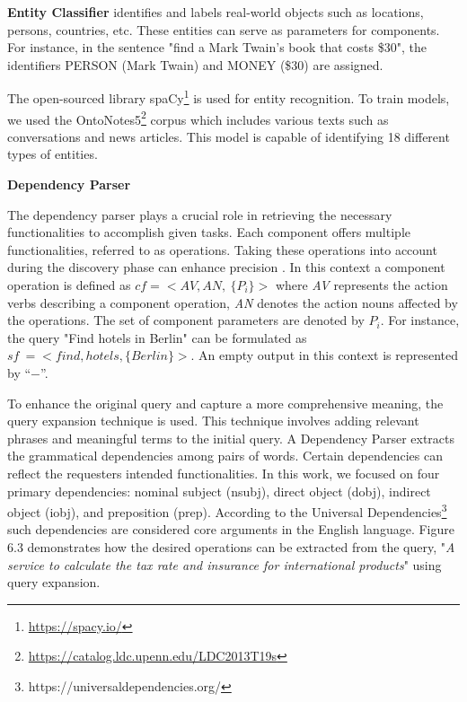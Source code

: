 \textbf{Entity Classifier} identifies and labels real-world objects such
as locations, persons, countries, etc. These entities can serve as
parameters for components. For instance, in the sentence "find a Mark
Twain's book that costs \$30", the identifiers PERSON (Mark Twain) and
MONEY (\$30) are assigned.

The open-sourced library spaCy\footnote{\url{https://spacy.io/}} is used
for entity recognition. To train models, we used the
OntoNotes5\footnote{\url{https://catalog.ldc.upenn.edu/LDC2013T19s}}
corpus which includes various texts such as conversations and news
articles. This model is capable of identifying 18 different types of
entities.


\textbf{Dependency Parser}

The dependency parser plays a crucial role in retrieving the necessary
functionalities to accomplish given tasks. Each component offers
multiple functionalities, referred to as operations. Taking these
operations into account during the discovery phase can enhance precision
\autocite{Zarei2021}. In this context a component operation is
defined as \(cf = < AV,AN,\ \{ P_{i}\} >\) where \emph{AV} represents
the action verbs describing a component operation, \emph{AN} denotes the
action nouns affected by the operations. The set of component parameters
are denoted by \(P_{i}\). For instance, the query "Find hotels in
Berlin" can be formulated as \(sf\  = < find,hotels,\{ Berlin\} >\). An
empty output in this context is represented by ``\(-\)''.

To enhance the original query and capture a more comprehensive meaning,
the query expansion technique is used. This technique involves adding
relevant phrases and meaningful terms to the initial query. A Dependency
Parser extracts the grammatical dependencies among pairs of words.
Certain dependencies can reflect the requester\textquotesingle s
intended functionalities. In this work, we focused on four primary
dependencies: nominal subject (nsubj), direct object (dobj), indirect
object (iobj), and preposition (prep). According to the Universal
Dependencies\footnote{https://universaldependencies.org/} such
dependencies are considered core arguments in the English language.
Figure 6.3 demonstrates how the desired operations can be extracted from
the query, "\emph{A service to calculate the tax rate and insurance for
international products}" using query expansion.


